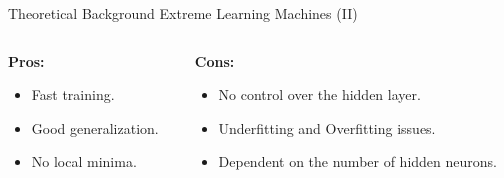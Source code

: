 \documentclass[aspectratio=169]{beamer}
\begin{document}
\begin{frame}{Theoretical Background \textendash{} Extreme Learning Machines (II)}
	\begin{columns}
		\begin{column}{0.4\textwidth}
			\textbf{Pros:}
			\begin{itemize}
				\item Fast training.
				\item Good generalization.
				\item No local minima.
			\end{itemize}
		\end{column}
		\begin{column}{0.4\textwidth}
			\textbf{Cons:}
			\begin{itemize}
				\item No control over the hidden layer.
				\item Underfitting and Overfitting issues.
				\item Dependent on the number of hidden neurons.
			\end{itemize}
		\end{column}
	\end{columns}
\end{frame}
\end{document}
